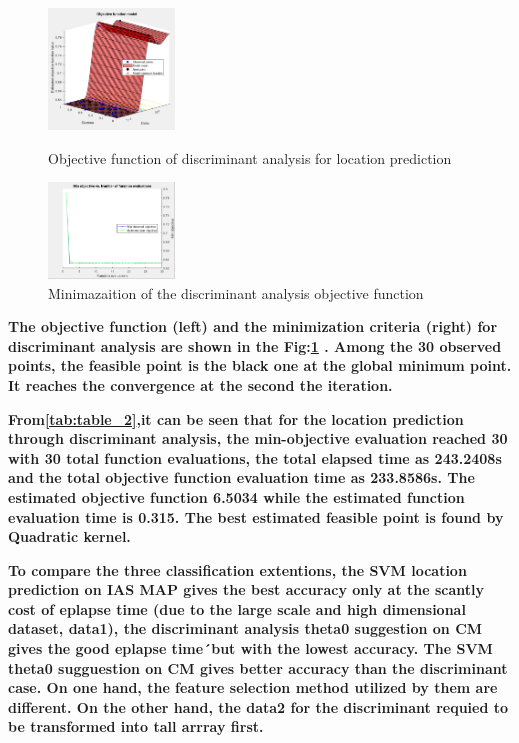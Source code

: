 \documentclass[5p]{elsarticle}
\begin{document}
\begin{frontmatter}
\begin{figure}[h!]
  \begin{minipage}
  \begin{center}
    \includegraphics[width=0.3\textwidth]{objective_function_DA.PNG}
  \end{center}
  \caption{Objective function of discriminant analysis for location prediction}
  \end{minipage}
  \begin{minipage}
  \begin{center}
    \includegraphics[width=0.3\textwidth]{objective_criteria_DA.PNG}
  \end{center}
  \caption{Minimazaition of the  discriminant analysis objective function}
  \end{minipage}
  \label{fig_21}  
\end{figure}

\bf  The objective function (left) and the minimization criteria (right) for discriminant analysis are shown in the Fig:\ref{fig_21} . Among the 30 observed points, the feasible point is the black one at the global minimum point. It reaches the convergence at the 
second the iteration. 

 \bf From\ref{tab:table_2},it can be seen that for the location prediction through discriminant analysis, the min-objective evaluation reached 30 with 30 total function evaluations, the total elapsed time as 243.2408s and the total objective function evaluation time as 233.8586s. The estimated objective function 6.5034 while the estimated function evaluation time is 0.315. The best estimated feasible point is found by Quadratic kernel.

\bf To compare the three classification extentions, the SVM location prediction on IAS MAP gives the best accuracy only at the scantly cost of eplapse time (due to the large scale and high dimensional dataset, data1), the discriminant analysis theta0 suggestion on CM gives the good eplapse time´but with the lowest accuracy. The SVM theta0 sugguestion on CM gives better accuracy than the discriminant case. On one hand, the feature selection method utilized by them are different. On the other hand, the data2 for the discriminant requied to be transformed into tall arrray first.


\end{frontmatter}
\end{document}
